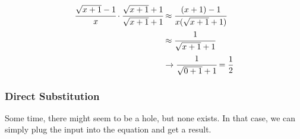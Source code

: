\begin{align*}
\cfrac{\sqrt{x+1}-1}{x} \cdot \cfrac{\sqrt{x+1}+1}{\sqrt{x+1}+1} &\approx \cfrac{(x+1)-1}{x(\sqrt{x+1}+1)}\\
&\approx \cfrac{1}{\sqrt{x+1}+1}\\
&\rightarrow \cfrac{1}{\sqrt{0+1}+1} = \frac{1}{2}
\end{align*}

\subsubsection{Direct Substitution}
Some time, there might seem to be a hole, but none exists.  In that case, we can simply plug
the input into the equation and get a result.


